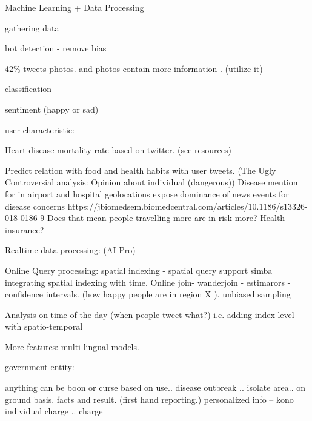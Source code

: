 
Machine Learning  +  Data Processing

gathering data

bot detection - remove bias


42\% tweets photos. and photos contain more information . (utilize it)

classification

sentiment (happy or sad)

user-characteristic:

Heart disease mortality rate based on twitter. (see resources)

Predict relation with food and health habits with user tweets. (The Ugly Controversial analysis: Opinion about individual (dangerous))
  Disease mention for
  in airport and hospital geolocations expose dominance of news events for disease concerns
  https://jbiomedsem.biomedcentral.com/articles/10.1186/s13326-018-0186-9
  Does that mean people travelling more are in risk more? Health insurance?


Realtime data processing:  (AI Pro)

Online Query processing:
  spatial indexing - spatial query support simba
  integrating spatial indexing with time.
  Online join- wanderjoin - estimarors - confidence intervals. (how happy people  are in region X ).
  unbiased sampling

  Analysis on time of the day  (when people tweet what?) i.e. adding index level with spatio-temporal


More features:
multi-lingual models.




government entity:

anything can be boon or curse based on use..
disease outbreak .. isolate area.. on ground basis. facts and result. (first hand reporting.)
personalized info -- kono individual charge .. charge
